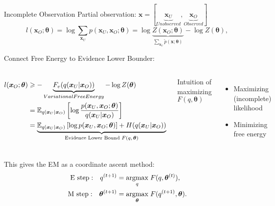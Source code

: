 \begin{frame}
  {Incomplete Observation}
  Partial observation: $\bm{x} = [  \underbrace{\bm{x}_U}_{Unobserved}, \underbrace{\bm{x}_O}_{Observed}]$
  \begin{equation*}
    l(\bm{x}_O; \bm{\theta}) = \log{\sum_{\bm{x}_U}p(\bm{x}_U, \bm{x}_O; \bm{\theta})} = \log{\underbrace{Z(\bm{x}_O;\bm{\theta})}_{\sum_{\bm{x}_U}\tilde{p}(\bm{x}; \bm{\theta})}} - \log{Z(\bm{\theta})},
  \end{equation*}

  {Connect Free Energy to Evidence Lower Bounder}:
  \begin{columns}
    \begin{align*}
      l(\bm{x}_O; \bm{\theta}) &\geqslant - \underbrace{F_v(q(\bm{x}_U|\bm{x}_O))}_{Variational Free Energy} - \log{Z(\bm{\theta})} \nonumber \\
                               & = \mathbb{E}_{q(\bm{x}_U|\bm{x}_O)}\left[ \log{\frac{{p}(\bm{x}_U, \bm{x}_O; \bm{\theta})}{q(\bm{x}_U|\bm{x}_O)}} \right] \nonumber \\
                               & = \underbrace{\mathbb{E}_{q(\bm{x}_U|\bm{x}_O)}\left[ \log{{p}(\bm{x}_U, \bm{x}_O; \bm{\theta})} \right] + H({q(\bm{x}_U|\bm{x}_O)})}_{\text{Evidence Lower Bound $F(q, \bm{\theta})$}}
    \end{align*}
    
    Intuition of maximizing $F(q,\bm{\theta})$
    \begin{itemize}[label=\textbullet]
    \item Maximizing (incomplete) likelihood
    \item Minimizing free energy
    \end{itemize}

  \end{columns}
  This gives the EM as a coordinate ascent method:
  \begin{align*}
    \mathrm{E~step:}~~~ q^{(t+1)} &= \underset{q}{\operatorname{argmax}}\;{F(q, \bm{\theta}^{(t)})}, \\
    \mathrm{M~step:}~~~\bm{\theta}^{(t+1)} &= \underset{\bm{\theta}}{\operatorname{argmax}}\;{F(q^{(t+1)}, \bm{\theta})}.
  \end{align*}
\end{frame}


